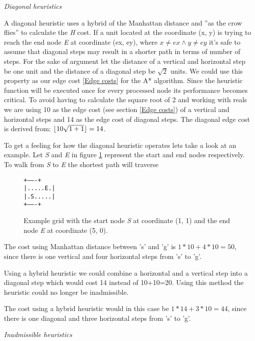 \documentclass[12pt, a4paper]{article}
\DeclarePairedDelimiter{\floor}{\lfloor}{\rfloor}
\begin{document}
\textit{Diagonal heuristics}

A diagonal heuristic uses a hybrid of the Manhattan distance and ''as the crow
flies'' to calculate the \textit{H} cost. If a unit located at the coordinate
(x, y) is trying to reach the end node \textit{E} at coordinate (ex, ey), where
$ x \ne ex \land y \ne ey $ it's safe to assume that diagonal steps may result
in a shorter path in terms of number of steps. For the sake of argument let the
distance of a vertical and horizontal step be one unit and the distance of a
diagonal step be $ \sqrt{2} $ units. We could use this property as our edge cost
\ref{Edge costs} for the A* algorithm. Since the heuristic function will be
executed once for every processed node its performance becomes critical. To
avoid having to calculate the square root of 2 and working with reals we are
using 10 as the edge cost (see section \ref{Edge costs}) of a vertical and
horizontal steps and 14 as the edge cost of diagonal steps. The diagonal edge
cost is derived from: $ \floor{10 \sqrt{1+1}} = 14 $.

To get a feeling for how the diagonal heuristic operates lets take a look at an
example. Let \textit{S} and \textit{E} in figure \ref{fig:grid} represent the
start and end nodes respectively. To walk from \textit{S} to \textit{E} the
shortest path will traverse

\begin{figure}[htbp]
	\centering
	\texttt{+-------+ \\
|.....E.| \\
|.S.....| \\
+-------+}
	\caption{\label{fig:grid} Example grid with the start node \textit{S} at
	coordinate (1, 1) and the end node \textit{E} at coordinate (5, 0).}
\end{figure}

The cost using Manhattan distance between 's' and 'g' is $ 1*10 + 4*10 = 50 $,
since there is one vertical and four horizontal steps from 's' to 'g'.

Using a hybrid heuristic we could combine a horizontal and a vertical step into
a diagonal step which would cost 14 instead of 10+10=20. Using this method the
heuristic could no longer be inadmissible.

The cost using a hybrid heuristic would in this case be $ 1*14 + 3*10 = 44 $,
since there is one diagonal and three horizontal steps from 's' to 'g'.

\textit{Inadmissible heuristics}

\end{document}
